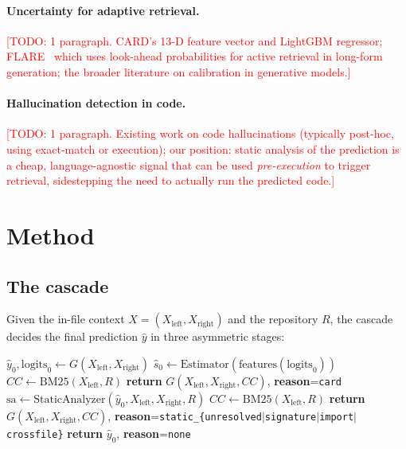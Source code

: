 \documentclass[10pt,twocolumn]{article}
\newcommand{\todo}[1]{\textcolor{red}{[TODO: #1]}}
\newcommand{\TRAG}{T_{\text{RAG}}}
\begin{document}
\paragraph{Uncertainty for adaptive retrieval.} \todo{1 paragraph. CARD's
13-D feature vector and LightGBM regressor; FLARE~\cite{jiang2023flare}
which uses look-ahead probabilities for active retrieval in long-form
generation; the broader literature on calibration in generative models.}

\paragraph{Hallucination detection in code.} \todo{1 paragraph. Existing
work on code hallucinations (typically post-hoc, using exact-match or
execution); our position: static analysis of the prediction is a cheap,
language-agnostic signal that can be used \emph{pre-execution} to trigger
retrieval, sidestepping the need to actually run the predicted code.}

\section{Method}

\subsection{The cascade}

Given the in-file context $X = (X_{\text{left}}, X_{\text{right}})$ and the
repository $R$, the cascade decides the final prediction $\hat{y}$ in three
asymmetric stages:

\begin{algorithm}[H]
\caption{The cascade pipeline (single-RAG).}
\begin{algorithmic}[1]
\STATE $\hat{y}_0, \text{logits}_0 \gets G(X_{\text{left}}, X_{\text{right}})$
\STATE $\hat{s}_0 \gets \text{Estimator}(\text{features}(\text{logits}_0))$
\IF{$\hat{s}_0 < \TRAG$}
    \STATE $CC \gets \text{BM25}(X_{\text{left}}, R)$
    \STATE \textbf{return} $G(X_{\text{left}}, X_{\text{right}}, CC)$, \textbf{reason}=\texttt{card}
\ENDIF
\STATE $\text{sa} \gets \text{StaticAnalyzer}(\hat{y}_0, X_{\text{left}}, X_{\text{right}}, R)$
    \STATE $CC \gets \text{BM25}(X_{\text{left}}, R)$
    \STATE \textbf{return} $G(X_{\text{left}}, X_{\text{right}}, CC)$, \textbf{reason}=\texttt{static\_\{unresolved$|$signature$|$import$|$crossfile\}}
\ENDIF
\STATE \textbf{return} $\hat{y}_0$, \textbf{reason}=\texttt{none}
\end{algorithmic}
\end{algorithm}
\end{document}
